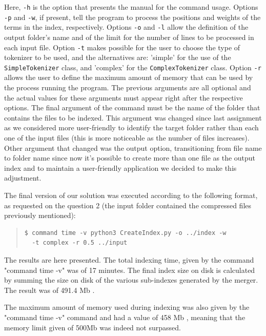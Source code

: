 \documentclass[12pt]{article}
\begin{document}
Here, \texttt{-h} is the option that presents the manual for the command usage.
Options \texttt{-p} and \texttt{-w}, if present, tell the program to process the
positions and weights of the terms in the index, respectively.
Options \texttt{-o} and \texttt{-l} allow the definition of the output folder's 
name and of the limit for the number of lines to be processed in each input file.
Option \texttt{-t} makes possible for the user to choose the type of tokenizer
to be used, and the alternatives are: 'simple' for the use of the 
\texttt{SimpleTokenizer} class, and 'complex' for the \texttt{ComplexTokenizer} class.
Option \texttt{-r} allows the user to define the maximum amount of memory that can
be used by the process running the program.
The previous arguments are all optional and the actual values for these arguments
must appear right after the respective options.
The final argument of the command must be the name of the folder that contains the
files to be indexed. This argument was changed since last assignment as we considered
more user-friendly to identify the target folder rather than each one of the input files
(this is more noticeable as the number of files increases). Other argument that changed
was the output option, transitioning from file name to folder name since now it's possible
to create more than one file as the output index and to maintain a user-friendly application we decided
to make this adjustment.

The final version of our solution was executed according to the following format,
as requested on the question 2 (the input folder contained the compressed
files previously mentioned):

\begingroup
\addtolength\leftmargini{-0.4in}
\addtolength\baselineskip{-0.05in}
\begin{quote}
\begin{verbatim}
$ command time -v python3 CreateIndex.py -o ../index -w 
  -t complex -r 0.5 ../input
\end{verbatim}
\end{quote}
\endgroup

The results are here presented. The total indexing time, given by the command
"command time -v" was of 17 minutes.
The final index size on disk is calculated by summing the size on disk of the 
various sub-indexes generated by the merger. 
The result was of 491.4 Mb .

The maximum amount of memory used during indexing was also given by the 
"command time -v" command and had a value of 458 Mb , meaning that
the memory limit given of 500Mb was indeed not surpassed.
\end{document}
